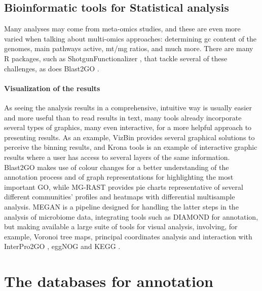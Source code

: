 \documentclass[
  oneside,
  11pt, a4paper,
  footinclude=true,
  headinclude=true,
  cleardoublepage=empty
]{scrbook}
\begin{document}
    \subsection{Bioinformatic tools for Statistical analysis}
    
    Many analyses may come from meta-omics studies, and these are even more varied when talking about multi-omics approaches: determining \gls{gc} content of the genomes, main pathways active, \gls{mt}/\gls{mg} ratios, and much more. There are many R packages, such as ShotgunFunctionalizer \citep{kristiansson2009shotgunfunctionalizer}, that tackle several of these challenges, as does Blast2GO \citep{conesa2005blast2go}.
    
    \paragraph{Visualization of the results}
    
    As seeing the analysis results in a comprehensive, intuitive way is usually easier and more useful than to read results in text, many tools already incorporate several types of graphics, many even interactive, for a more helpful approach to presenting results. As an example, VizBin \citep{laczny2015vizbin} provides several graphical solutions to perceive the binning results, and Krona tools \citep{ondov2011interactive} is an example of interactive graphic results where a user has access to several layers of the same information. Blast2GO \citep{conesa2005blast2go} makes use of colour changes for a better understanding of the annotation process and of graph representations for highlighting the most important GO, while MG-RAST \citep{glass2010using} provides pie charts representative of several different communities' profiles and heatmaps with differential multisample analysis. MEGAN \citep{huson2007megan}  is a pipeline designed for handling the latter steps in the analysis of microbiome data, integrating tools such as DIAMOND for annotation, but making available a large suite of tools for visual analysis, involving, for example, Voronoi tree maps, principal coordinates analysis and interaction with InterPro2GO \citep{camon2004gene}, eggNOG \citep{powell2012eggnog} and KEGG \citep{Kanehisa2000a}.
    
    \section{The databases for annotation}
    
\end{document}
